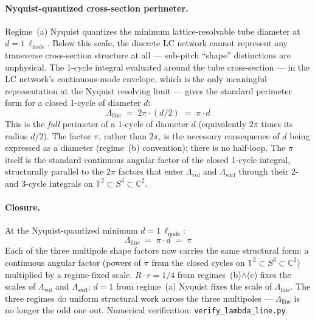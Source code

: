 \paragraph{Nyquist-quantized cross-section perimeter.}
Regime~(a) Nyquist quantizes the minimum lattice-resolvable tube diameter at $d = 1\,\ell_{\text{node}}$. Below this scale, the discrete LC network cannot represent any transverse cross-section structure at all --- sub-pitch ``shape'' distinctions are unphysical. The 1-cycle integral evaluated around the tube cross-section --- in the LC network's continuous-mode envelope, which is the only meaningful representation at the Nyquist resolving limit --- gives the standard perimeter form for a closed 1-cycle of diameter $d$:
\begin{equation}
    \Lambda_{\text{line}} \;=\; 2\pi \cdot (d/2) \;=\; \pi \cdot d
    \label{eq:lambda_line_form}
\end{equation}
This is the \emph{full} perimeter of a 1-cycle of diameter $d$ (equivalently $2\pi$ times its radius $d/2$). The factor $\pi$, rather than $2\pi$, is the necessary consequence of $d$ being expressed as a diameter (regime~(b) convention); there is no half-loop. The $\pi$ itself is the standard continuous angular factor of the closed 1-cycle integral, structurally parallel to the $2\pi$ factors that enter $\Lambda_{\text{vol}}$ and $\Lambda_{\text{surf}}$ through their 2- and 3-cycle integrals on $\mathbb{T}^2 \subset S^3 \subset \mathbb{C}^2$.

\paragraph{Closure.}
At the Nyquist-quantized minimum $d = 1\,\ell_{\text{node}}$:
\begin{equation}
    \Lambda_{\text{line}} \;=\; \pi \cdot d \;=\; \pi
    \label{eq:lambda_line_value}
\end{equation}
Each of the three multipole shape factors now carries the same structural form: a continuous angular factor (powers of $\pi$ from the closed cycles on $\mathbb{T}^2 \subset S^3 \subset \mathbb{C}^2$) multiplied by a regime-fixed scale. $R \cdot r = 1/4$ from regimes~(b)$\wedge$(c) fixes the scales of $\Lambda_{\text{vol}}$ and $\Lambda_{\text{surf}}$; $d = 1$ from regime~(a) Nyquist fixes the scale of $\Lambda_{\text{line}}$. The three regimes do uniform structural work across the three multipoles --- $\Lambda_{\text{line}}$ is no longer the odd one out. Numerical verification: \texttt{verify\_lambda\_line.py}.

